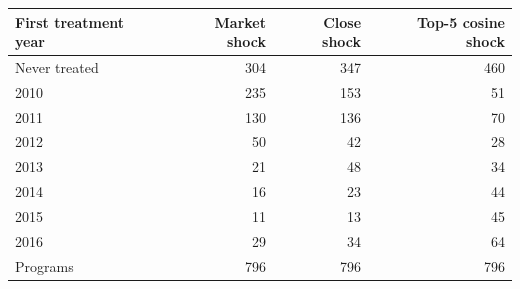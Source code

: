 \begin{tabular}{lrrr}
\toprule
First treatment year & Market shock & Close shock & Top-5 cosine shock \\
\midrule
Never treated &    304 &    347 &    460 \\
2010 &    235 &    153 &     51 \\
2011 &    130 &    136 &     70 \\
2012 &     50 &     42 &     28 \\
2013 &     21 &     48 &     34 \\
2014 &     16 &     23 &     44 \\
2015 &     11 &     13 &     45 \\
2016 &     29 &     34 &     64 \\
\midrule
Programs &    796 &    796 &    796 \\
\bottomrule
\end{tabular}
